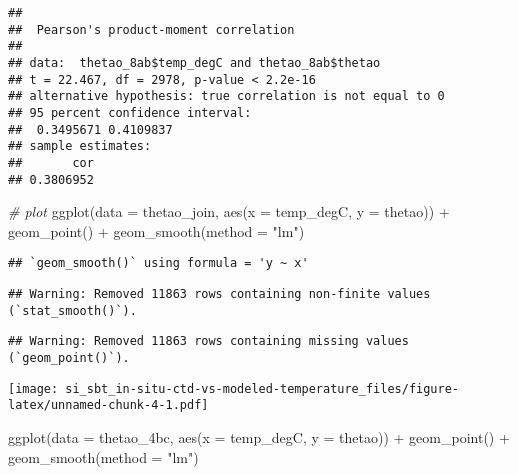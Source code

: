 \documentclass[
]{article}
\newenvironment{Shaded}{\begin{snugshade}}{\end{snugshade}}
\newcommand{\AttributeTok}[1]{\textcolor[rgb]{0.77,0.63,0.00}{#1}}
\newcommand{\CommentTok}[1]{\textcolor[rgb]{0.56,0.35,0.01}{\textit{#1}}}
\newcommand{\FunctionTok}[1]{\textcolor[rgb]{0.00,0.00,0.00}{#1}}
\newcommand{\NormalTok}[1]{#1}
\newcommand{\SpecialCharTok}[1]{\textcolor[rgb]{0.00,0.00,0.00}{#1}}
\newcommand{\StringTok}[1]{\textcolor[rgb]{0.31,0.60,0.02}{#1}}
\begin{document}
\begin{Shaded}
\end{Shaded}

\begin{verbatim}
## 
##  Pearson's product-moment correlation
## 
## data:  thetao_8ab$temp_degC and thetao_8ab$thetao
## t = 22.467, df = 2978, p-value < 2.2e-16
## alternative hypothesis: true correlation is not equal to 0
## 95 percent confidence interval:
##  0.3495671 0.4109837
## sample estimates:
##       cor 
## 0.3806952
\end{verbatim}

\begin{Shaded}
\begin{Highlighting}[]
\CommentTok{\# plot}
\FunctionTok{ggplot}\NormalTok{(}\AttributeTok{data =}\NormalTok{ thetao\_join, }\FunctionTok{aes}\NormalTok{(}\AttributeTok{x =}\NormalTok{ temp\_degC, }\AttributeTok{y =}\NormalTok{ thetao)) }\SpecialCharTok{+} \FunctionTok{geom\_point}\NormalTok{() }\SpecialCharTok{+} \FunctionTok{geom\_smooth}\NormalTok{(}\AttributeTok{method =} \StringTok{"lm"}\NormalTok{)}
\end{Highlighting}
\end{Shaded}

\begin{verbatim}
## `geom_smooth()` using formula = 'y ~ x'
\end{verbatim}

\begin{verbatim}
## Warning: Removed 11863 rows containing non-finite values (`stat_smooth()`).
\end{verbatim}

\begin{verbatim}
## Warning: Removed 11863 rows containing missing values (`geom_point()`).
\end{verbatim}

\texttt{[image: si\_sbt\_in-situ-ctd-vs-modeled-temperature\_files/figure-latex/unnamed-chunk-4-1.pdf]}

\begin{Shaded}
\begin{Highlighting}[]
\FunctionTok{ggplot}\NormalTok{(}\AttributeTok{data =}\NormalTok{ thetao\_4bc, }\FunctionTok{aes}\NormalTok{(}\AttributeTok{x =}\NormalTok{ temp\_degC, }\AttributeTok{y =}\NormalTok{ thetao)) }\SpecialCharTok{+} \FunctionTok{geom\_point}\NormalTok{() }\SpecialCharTok{+} \FunctionTok{geom\_smooth}\NormalTok{(}\AttributeTok{method =} \StringTok{"lm"}\NormalTok{) }
\end{Highlighting}
\end{Shaded}
\end{document}
